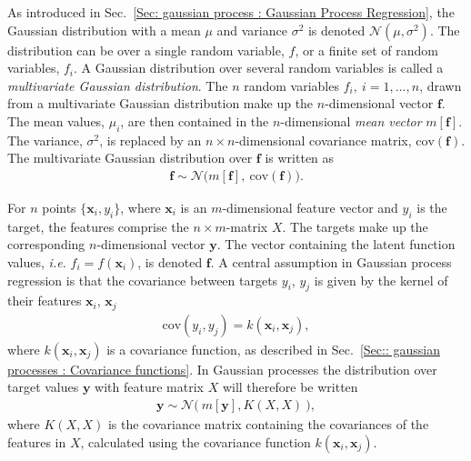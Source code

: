 \documentclass[twoside,english]{uiofysmaster}
\begin{document}
{{As introduced in Sec.~\ref{Sec: gaussian process : Gaussian Process Regression}, the Gaussian distribution with a mean $\mu$ and variance $\sigma^2$ is denoted $\mathcal{N}(\mu, \sigma^2)$. The distribution can be over a single random variable, $f$, or a finite set of random variables, $f_i$. A Gaussian distribution over several random variables is called a \textit{multivariate Gaussian distribution}. The $n$ random variables $f_i, ~i=1,...,n$, drawn from a multivariate Gaussian distribution make up the $n$-dimensional vector $\textbf{f}$. The mean values, $\mu_i$, are then contained in the $n$-dimensional \textit{mean vector} $m[\textbf{f}]$. The variance, $\sigma^2$, is replaced by an $n \times n$-dimensional covariance matrix, $\text{cov}(\textbf{f})$. The multivariate Gaussian distribution over $\textbf{f}$ is written as
\begin{align}
\textbf{f} \sim \mathcal{N} \big(m[\textbf{f}], ~\text{cov}(\textbf{f})  \big).
\end{align}  

For $n$ points $\{\textbf{x}_i , y_i\}$, where $\textbf{x}_i$ is an $m$-dimensional feature vector and $y_i$ is the target, the features comprise the $n \times m$-matrix $X$. The targets make up the corresponding $n$-dimensional vector $\textbf{y}$. The vector containing the latent function values, \textit{i.e.} $f_i = f(\textbf{x}_i)$, is denoted $\textbf{f}$. A central assumption in Gaussian process regression is that the covariance between targets $y_i$, $y_j$ is given by the kernel of their features $\textbf{x}_i$, $\textbf{x}_j$
\begin{align}\label{Eq:: gaussian process : cov(y) gaussian process}
\text{cov}(y_i, y_j) = k(\textbf{x}_i, \textbf{x}_j),
\end{align}
where $k(\textbf{x}_i, \textbf{x}_j)$ is a covariance function, as described in Sec.~\ref{Sec:: gaussian processes : Covariance functions}. In Gaussian processes the distribution over target values $\textbf{y}$ with feature matrix $X$ will therefore be written
\begin{align}\label{Eq:: gaussian process : Normal distribution GP}
\textbf{y} \sim \mathcal{N} \big(~m[ \textbf{y} ], K(X, X) ~\big),
\end{align}
where $K(X,X)$ is the covariance matrix containing the covariances of the features in $X$, calculated using the covariance function $k(\textbf{x}_i, \textbf{x}_j)$.

}}
\end{document}
